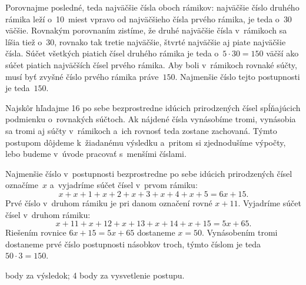 {%
Porovnajme posledné, teda najväčšie čísla oboch rámikov: najväčšie číslo
druhého rámika leží o~10~miest vpravo od najväčšieho čísla prvého rámika,
je teda o~$30$ väčšie. Rovnakým porovnaním zistíme, že druhé najväčšie čísla
v~rámikoch sa líšia tiež o~$30$, rovnako tak tretie najväčšie, štvrté najväčšie
aj piate najväčšie čísla. Súčet všetkých piatich čísel druhého rámika je teda
o~$5\cdot30=150$ väčší ako súčet piatich najväčších čísel prvého rámika. Aby
boli v~rámikoch rovnaké súčty, musí byť zvyšné číslo prvého rámika
práve~$150$. Najmenšie číslo tejto postupnosti je teda~$150$.

\ineriesenie
Najskôr hľadajme 16 po sebe bezprostredne idúcich prirodzených čísel
spĺňajúcich podmienku o~rovnakých súčtoch. Ak nájdené čísla vynásobíme
tromi, vynásobia sa tromi aj súčty v~rámikoch a~ich rovnosť teda zostane
zachovaná. Týmto postupom dôjdeme k~žiadanému výsledku a~pritom si
zjednodušíme výpočty, lebo budeme v~úvode pracovať s~menšími číslami.

Najmenšie číslo v~postupnosti bezprostredne po sebe idúcich prirodzených
čísel označíme~$x$ a~vyjadríme súčet čísel v~prvom rámiku:
$$
x+x+1+x+2+x+3+x+4+x+5=6x+15.
$$
Prvé číslo v~druhom rámiku je pri danom označení rovné $x+11$.
Vyjadríme súčet čísel v~druhom rámiku:
$$
x+11+x+12+x+13+x+14+x+15=5x+65.
$$
Riešením rovnice $6x+15=5x+65$ dostaneme $x=50$.
Vynásobením tromi dostaneme prvé číslo postupnosti násobkov troch,
týmto číslom je teda $50\cdot3=150$.

 body za výsledok; 4 body za vysvetlenie postupu.
\endhodnotenie
}

